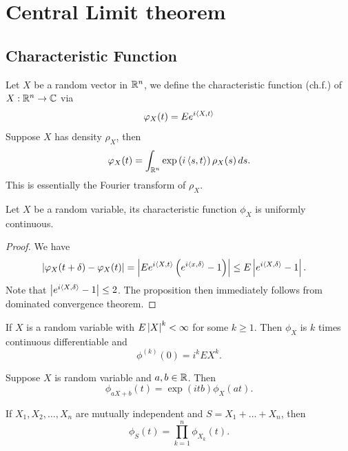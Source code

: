 \documentclass[a4paper]{article}
\begin{document}
\section{Central Limit theorem}

\subsection{Characteristic Function}

\begin{defi}
  Let $X$ be a random vector in $\mathbb{R}^n$, we define the 
  characteristic function (ch.f.) of $X : \mathbb{R}^n \to \mathbb{C}$ via 
  \[
  \varphi_X (t) = E e^{i \left\langle X, t \right\rangle}
  \]
  Suppose $X$ has density $\rho_X$, then 
  \[
  \varphi_X (t) = \int_{\mathbb{R}^n} \exp \left( i \left\langle s, t \right\rangle \right) 
  \rho_X (s) \, d s.
  \]
  This is essentially the Fourier transform of $\rho_X$.
\end{defi}

\begin{prop}
  Let $X$ be a random variable, its characteristic function 
  $\phi_X$ is uniformly continuous.
\end{prop}

\begin{proof}
  We have 
  \begin{align*}
    \left\lvert \varphi_X (t + \delta) - \varphi_X (t)\right\rvert 
    &= \left\lvert  E e^{i \left\langle X, t \right\rangle} \left( e^{i \left\langle x, \delta \right\rangle} - 1 \right) \right\rvert
    \leq E \left\lvert  e^{i \left\langle X, \delta \right\rangle} - 1 \right\rvert.
  \end{align*}
  Note that $\left\lvert e^{i \left\langle X, \delta \right\rangle} - 1\right\rvert \leq 2$. The proposition 
  then immediately follows from dominated convergence theorem.
\end{proof}

\begin{prop}
  If $X$ is a random variable with $E \left\lvert X\right\rvert^k < \infty$ 
  for some $k \geq 1$. Then $\phi_X$ is $k$ times continuous 
  differentiable and 
  \[
  \phi^{(k)}(0) = i^k E X^k.
  \]
\end{prop}

\begin{prop}
  Suppose $X$ is random variable and $a, b \in \mathbb{R}$. Then 
  \[
  \phi_{aX + b} (t) = \exp (itb) \phi_X (at).
  \]
\end{prop}

\begin{prop}
  If $X_1, X_2, \dots, X_n$ are mutually independent and 
  $S = X_1 + \dots + X_n$, then 
  \[
  \phi_S (t) = \prod_{k=1}^n \phi_{X_k} (t).
  \]
\end{prop}
\end{document}
